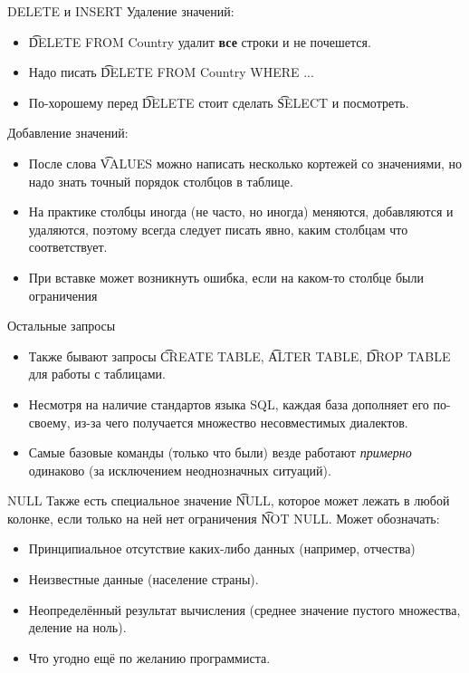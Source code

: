 \begin{frame}{DELETE и INSERT}
	Удаление значений:
	\begin{itemize}
		\item \t{DELETE FROM Country} удалит \textbf{все} строки и не почешется.
		\item Надо писать \t{DELETE FROM Country WHERE ...}
		\item По-хорошему перед \t{DELETE} стоит сделать \t{SELECT} и посмотреть.
	\end{itemize}
	Добавление значений:
	\begin{itemize}
		\item
			После слова \t{VALUES} можно написать несколько кортежей со значениями,
			но надо знать точный порядок столбцов в таблице.
		\item На практике столбцы иногда (не часто, но иногда) меняются, добавляются и удаляются,
			поэтому всегда следует писать явно, каким столбцам что соответствует.
		\item При вставке может возникнуть ошибка, если на каком-то столбце были ограничения
	\end{itemize}
\end{frame}

\begin{frame}{Остальные запросы}
	\begin{itemize}
		\item Также бывают запросы \t{CREATE TABLE}, \t{ALTER TABLE}, \t{DROP TABLE} для работы с таблицами.
		\item Несмотря на наличие стандартов языка SQL, каждая база дополняет его по-своему,
			из-за чего получается множество несовместимых диалектов.
		\item Самые базовые команды (только что были) везде работают \textit{примерно} одинаково
			(за исключением неоднозначных ситуаций).
	\end{itemize}
\end{frame}

\begin{frame}{NULL}
	Также есть специальное значение \t{NULL}, которое может лежать в любой колонке, если только на ней нет ограничения \t{NOT NULL}.
	Может обозначать:
	\begin{itemize}
		\item Принципиальное отсутствие каких-либо данных (например, отчества)
		\item Неизвестные данные (население страны).
		\item Неопределённый результат вычисления (среднее значение пустого множества, деление на ноль).
		\item Что угодно ещё по желанию программиста.
	\end{itemize}
\end{frame}

